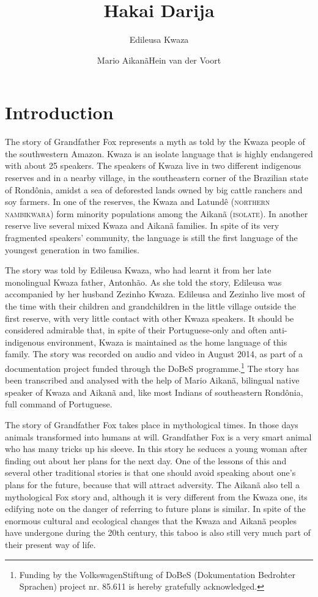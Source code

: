 \documentclass[output=paper,
modfonts,nonflat
]{langsci/langscibook}
\author{Edileusa Kwaza\and 
 Mario Aikanã\lastand Hein van der Voort\affiliation{Museu Paraense Emílio Goeldi}
}
\title{Hakai Darija}
\begin{document}
\section{Introduction} 
 
The story of Grandfather Fox represents a myth as told by the Kwaza people of the southwestern Amazon. Kwaza is an isolate language that is highly endangered with about 25 speakers. The speakers of Kwaza live in two different indigenous reserves and in a nearby village, in the southeastern corner of the Brazilian state of Rondônia, amidst a sea of deforested lands owned by big cattle ranchers and soy farmers. In one of the reserves, the Kwaza and Latundê (\textsc{northern nambikwara}) form minority populations among the Aikanã (\textsc{isolate}). In another reserve live several mixed Kwaza and Aikanã families. In spite of its very fragmented speakers’ community, the language is still the first language of the youngest generation in two families. 

  The story was told by Edileusa Kwaza, who had learnt it from her late monolingual Kwaza father, Antonhão. As she told the story, Edileusa was accompanied by her husband Zezinho Kwaza. Edileusa and Zezinho live most of the time with their children and grandchildren in the little village outside the first reserve, with very little contact with other Kwaza speakers. It should be considered admirable that, in spite of their Portuguese-only and often anti-indigenous environment, Kwaza is maintained as the home language of this family. The story was recorded on audio and video in August 2014, as part of a documentation project funded through the DoBeS programme.\footnote{ Funding by the VolkswagenStiftung of DoBeS (Dokumentation Bedrohter Sprachen) project nr. 85.611 is hereby gratefully acknowledged.} The story has been transcribed and analysed with the help of Mario Aikanã, bilingual native speaker of Kwaza and Aikanã and, like most Indians of southeastern Rondônia, full command of Portuguese.

  The story of Grandfather Fox takes place in mythological times. In those days animals transformed into humans at will. Grandfather Fox is a very smart animal who has many tricks up his sleeve. In this story he seduces a young woman after finding out about her plans for the next day. One of the lessons of this and several other traditional stories is that one should avoid speaking about one’s plans for the future, because that will attract adversity. The Aikanã also tell a mythological Fox story and, although it is very different from the Kwaza one, its edifying note on the danger of referring to future plans is similar. In spite of the enormous cultural and ecological changes that the Kwaza and Aikanã peoples have undergone during the 20th century, this taboo is also still very much part of their present way of life.
\end{document}
